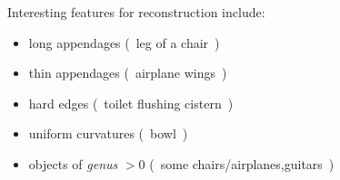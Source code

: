    Interesting features for reconstruction include:
   \begin{itemize}
      \item long appendages (~leg of a chair~)
      \item thin appendages (~airplane wings~)
      \item hard edges (~toilet flushing cistern~)
      \item uniform curvatures (~bowl~)
      \item objects of \emph{genus} $>0$ (~some chairs/airplanes,guitars~)
   \end{itemize}
